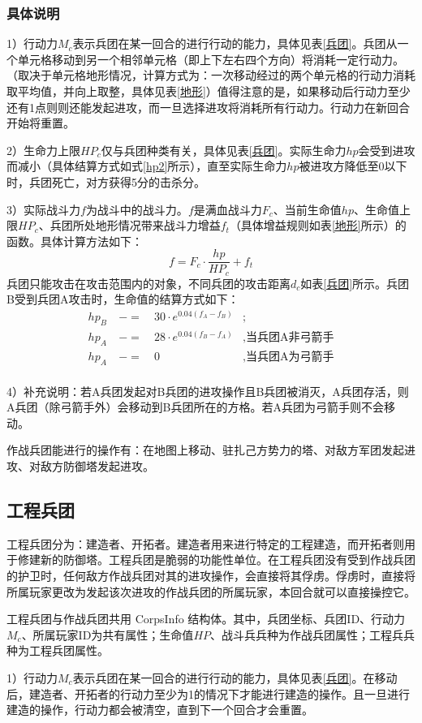 \documentclass[a4paper,4pt]{article}
\begin{document}
\subsubsection{具体说明}
1）行动力$M_c$表示兵团在某一回合的进行行动的能力，具体见表\ref{兵团}。兵团从一个单元格移动到另一个相邻单元格（即上下左右四个方向）将消耗一定行动力。（取决于单元格地形情况，计算方式为：一次移动经过的两个单元格的行动力消耗取平均值，并向上取整，具体见表\ref{地形}）值得注意的是，如果移动后行动力至少还有1点则则还能发起进攻，而一旦选择进攻将消耗所有行动力。行动力在新回合开始将重置。\par
2）生命力上限$HP_c$仅与兵团种类有关，具体见表\ref{兵团}。实际生命力$hp$会受到进攻而减小（具体结算方式如式\ref{hp2}所示），直至实际生命力$hp$被进攻方降低至0以下时，兵团死亡，对方获得5分的击杀分。\par
3）实际战斗力$f$为战斗中的战斗力。$f$是满血战斗力$F_c$、当前生命值$hp$、生命值上限$HP_c$、兵团所处地形情况带来战斗力增益$f_t$（具体增益规则如表\ref{地形}所示）的函数。具体计算方法如下：
\begin{equation}
	f = F_c \cdot \frac{hp}{HP_c} + f_t\label{f2}
\end{equation}
兵团只能攻击在攻击范围内的对象，不同兵团的攻击距离$d_c$如表\ref{兵团}所示。兵团B受到兵团A攻击时，生命值的结算方式如下：
\begin{equation}
	\begin{aligned}
		hp_{B} & \ -= & \ 30 \cdot e^{0.04(f_{A}-f_{B})} & ;                        \\
		hp_{A} & \ -= & \ 28 \cdot e^{0.04(f_{B}-f_{A})} & , \text{当兵团A非弓箭手} \\
		hp_{A} & \ -= & \ 0                              & , \text{当兵团A为弓箭手} \\
	\end{aligned}
	\label{hp2}
\end{equation}\par
4）补充说明：若A兵团发起对B兵团的进攻操作且B兵团被消灭，A兵团存活，则A兵团（除弓箭手外）会移动到B兵团所在的方格。若A兵团为弓箭手则不会移动。

作战兵团能进行的操作有：在地图上移动、驻扎己方势力的塔、对敌方军团发起进攻、对敌方防御塔发起进攻。


\subsection{工程兵团}
工程兵团分为：建造者、开拓者。建造者用来进行特定的工程建造，而开拓者则用于修建新的防御塔。工程兵团是脆弱的功能性单位。在工程兵团没有受到作战兵团的护卫时，任何敌方作战兵团对其的进攻操作，会直接将其俘虏。俘虏时，直接将所属玩家更改为发起该次进攻的作战兵团的所属玩家，本回合就可以直接操控它。\par
工程兵团与作战兵团共用 CorpsInfo 结构体。其中，兵团坐标、兵团ID、行动力$M_c$、所属玩家ID为共有属性；生命值$HP$、战斗兵兵种为作战兵团属性；工程兵兵种为工程兵团属性。\par
1）行动力$M_c$表示兵团在某一回合的进行行动的能力，具体见表\ref{兵团}。在移动后，建造者、开拓者的行动力至少为1的情况下才能进行建造的操作。且一旦进行建造的操作，行动力都会被清空，直到下一个回合才会重置。\par
\end{document}
